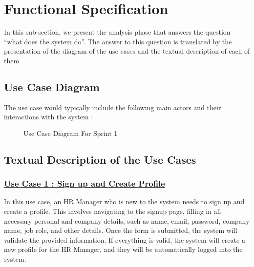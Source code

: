 



\newpage
\section{Functional Specification}
In this sub-section, we present the analysis phase that answers the question “what does the system do”. The answer to this question is translated by the presentation of the diagram of the use cases and the textual description of each of them

\subsection{Use Case Diagram}
The use case would typically include the following main actors and their interactions with the system :

\begin{figure}[H]
    \centering
    \caption{ Use Case Diagram For Sprint 1 }
    \label{fig:Sprint1_UseCaseDiagram}
\end{figure}

\subsection{Textual Description of the Use Cases}

\subsubsection{\underline{Use Case 1 : Sign up and Create Profile}}
In this use case, an HR Manager who is new to the system needs to sign up and create a profile. This involves navigating to the signup page, filling in all necessary personal and company details, such as name, email, password, company name, job role, and other details. Once the form is submitted, the system will validate the provided information. If everything is valid, the system will create a new profile for the HR Manager, and they will be automatically logged into the system.

